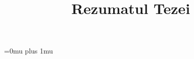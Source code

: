 \documentclass{template/thesis.cs.pub.ro}
\begin{document}



\title{Rezumatul Tezei}

\begin{frontmatter} %



\end{frontmatter} %



\Urlmuskip=0mu plus 1mu\relax

% 
% 

\end{document}
